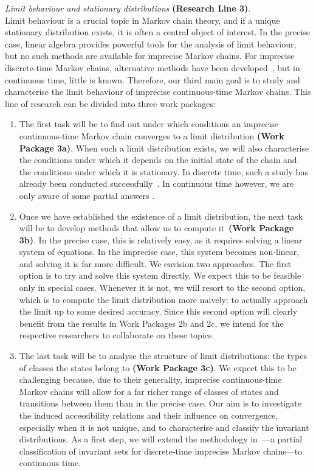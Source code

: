 \documentclass[11pt,dvipsnames,usenames,a4paper]{article}
\begin{document}
\emph{Limit behaviour and stationary distributions} {\bf (Research Line 3)}.\\[3pt]
Limit behaviour is a crucial topic in Markov chain theory, and if a unique stationary distribution exists, it is often a central object of interest. 
In the precise case, linear algebra provides powerful tools for the analysis of limit behaviour, but no such methods are available for imprecise Markov chains. 
For imprecise discrete-time Markov chains, alternative methods have been developed~\cite{cooman2008}, but in continuous time, little is known. 
Therefore, our third main goal is to study and characterise the limit behaviour of imprecise continuous-time Markov chains. 
This line of research can be divided into three work packages:
\begin{enumerate}[label=\tiny$\blacksquare$,leftmargin=*,noitemsep]
\item The first task will be to find out under which conditions an imprecise continuous-time Markov chain converges to a limit distribution {\bf (Work Package 3a)}. 
When such a limit distribution exists, we will also characterise the conditions under which it depends on the initial state of the chain and the conditions under which it is stationary. 
In discrete time, such a study has already been conducted successfully~\cite{hermans2012,cooman2008}. 
In continuous time however, we are only aware of some partial answers \cite{DeBock:2016:iCTMClimit}.
\item Once we have established the existence of a limit distribution, the next task will be to develop methods that allow us to compute it~{\bf (Work Package 3b)}. 
In the precise case, this is relatively easy, as it requires solving a linear system of equations. 
In the imprecise case, this system becomes non-linear, and solving it is far more difficult. 
We envision two approaches. 
The first option is to try and solve this system directly. 
We expect this to be feasible only in special cases. 
Whenever it is not, we will resort to the second option, which is to compute the limit distribution more naively: to actually approach the limit up to some desired accuracy. 
Since this second option will clearly benefit from the results in Work Packages 2b and 2c, we intend for the respective researchers to collaborate on these topics.
\item The last task  will be to analyse the structure of limit distributions: the types of classes the states belong to {\bf (Work Package 3c)}.
We expect this to be challenging because, due to their generality, imprecise continuous-time Markov chains will allow for a far richer range of classes of states and transitions between them than in the precise case. 
Our aim is to investigate the induced accessibility relations and their influence on convergence, especially when it is not unique, and to characterise and classify the invariant distributions. 
As a first step, we will extend the methodology in~\cite{skulj:13b}---a partial classification of invariant sets for discrete-time imprecise Markov chains---to continuous time. 
\end{enumerate}
\end{document}
